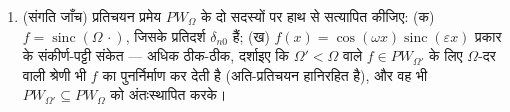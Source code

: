 \begin{problem}[{सप्ताहांत समस्या --- $\partial_tu =
\partial^2_{xx}u$, आरंभ से अंत तक हल}]
\begin{enumerate}[resume]
        अभियांत्रिकी का नियम उचित ठहराइए: $\Omega$ तक आवृत्ति-सीमित
        और जिसकी ऊर्जा मूलतः लंबाई $T$ की समय-खिड़की में हो, ऐसा
        संकेत लगभग $\frac{\Omega T}\pi$ वास्तविक प्रतिदर्शों से वर्णित हो जाता है
        --- ``मूलतः'' को ऊर्जा सर्वसमिका और पुच्छ $\sum_{\abs{n\pi/\Omega} >
        T/2}$ के माध्यम
        से यथार्थ बनाइए।
  \item (संगति जाँच) प्रतिचयन प्रमेय $PW_\Omega$ के दो सदस्यों पर हाथ
        से सत्यापित कीजिए: (क) $f =
        \operatorname{sinc}(\Omega\,\cdot)$, जिसके प्रतिदर्श $\delta_{n0}$ हैं;
        (ख) $f(x) = \cos(\omega x)
        \operatorname{sinc}(\varepsilon x)$ प्रकार के संकीर्ण-पट्टी संकेत --- अधिक ठीक-ठीक,
        दर्शाइए कि $\Omega' < \Omega$ वाले $f \in
        PW_{\Omega'}$ के लिए $\Omega$-दर वाली श्रेणी भी
        $f$ का पुनर्निर्माण कर देती है (अति-प्रतिचयन हानिरहित
        है), और वह भी $PW_
        {\Omega'} \subseteq PW_\Omega$ को अंतःस्थापित करके।
\end{enumerate}


\end{problem}
